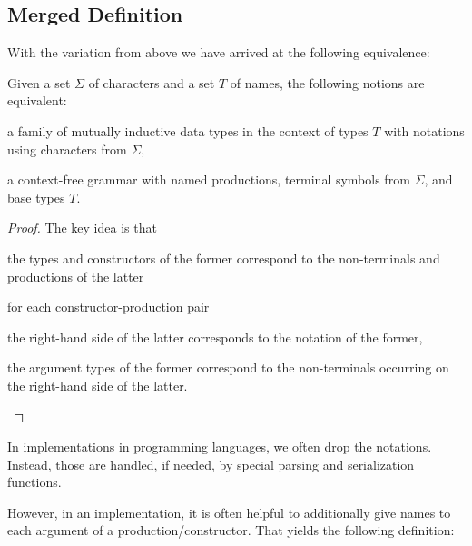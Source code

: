\subsection{Merged Definition}

With the variation from above we have arrived at the following equivalence:

\begin{theorem}
Given a set $\Sigma$ of characters and a set $T$ of names, the following notions are equivalent:
\begin{compactitem}
\item a family of mutually inductive data types in the context of types $T$ with notations using characters from $\Sigma$,
\item a context-free grammar with named productions, terminal symbols from $\Sigma$, and base types $T$.
\end{compactitem}
\end{theorem}
\begin{proof}
The key idea is that
\begin{compactitem}
 \item the types and constructors of the former correspond to the non-terminals and productions of the latter
 \item for each constructor-production pair
  \begin{compactitem}
   \item the right-hand side of the latter corresponds to the notation of the former,
   \item the argument types of the former correspond to the non-terminals occurring on the right-hand side of the latter.
  \end{compactitem}
\end{compactitem}
\end{proof}

In implementations in programming languages, we often drop the notations.
Instead, those are handled, if needed, by special parsing and serialization functions.

However, in an implementation, it is often helpful to additionally give names to each argument of a production/constructor.
That yields the following definition:

